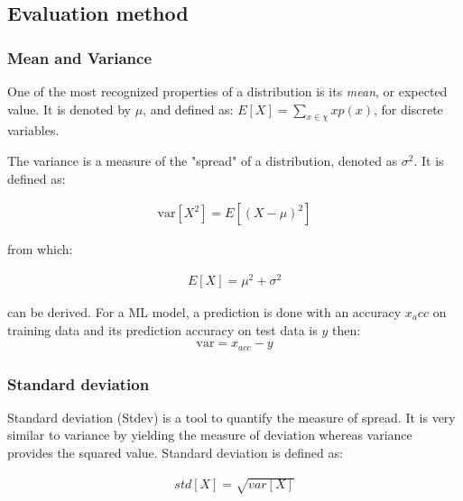 	

\subsection{Evaluation method}\label{sec:evaluation_method} %


\subsubsection{Mean and Variance}
One of the most recognized properties of a distribution is its \textit{mean}, or expected value. It is denoted by $\mu$, and defined as: $E[X] = \sum_{x \in \chi}x p(x)$, for discrete variables.

The variance is a measure of the "spread" of a distribution, denoted as $\sigma^2$. It is defined as:

\begin{align}
\text{var}[X^2] = E[(X - \mu)^2]
\end{align}

from which:

\begin{align}
E[X] =\mu^2 + \sigma^2
\end{align}

can be derived. For a ML model, a prediction is done with an accuracy $x_acc$ on training data and its prediction accuracy on test data is $y$ then:
\begin{align}
\text{var} = x_{acc} - y
\end{align}

\subsubsection{Standard deviation}

Standard deviation (\ac{Stdev}) is a tool to quantify the measure of spread. It is very similar to variance by yielding the measure of deviation whereas variance provides the squared value. Standard deviation is defined as:

\begin{align}
std[X] = \sqrt{var[X]}
\end{align}

